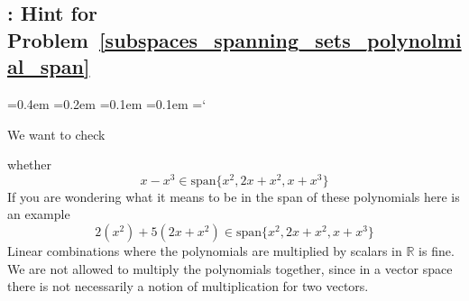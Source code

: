 
\subsection{\subspacesTitle: Hint for Problem~\ref{subspaces_spanning_sets_polynolmial_span}}

{\ttfamily
{}\font=0.4em
\font=0.2em
\font=0.1em
\font=0.1em
\hyphenchar\font=`\-

\hypertarget{subspaces_and_spanning_sets_hint_2}{We want to check} whether 
\[
x-x^3 \in \text{span}\{x^2, 2x+x^2, x+ x^3 \}
\]
If you are wondering what it means to be in the span of these polynomials here is an example
\[
2(x^2) + 5(2x+x^2) \in \text{span}\{x^2, 2x+x^2, x+ x^3 \}
\]
Linear combinations where the polynomials are multiplied by scalars in $\mathbb{R}$ is fine. We are not allowed to multiply the polynomials together, since in a vector space there is not necessarily a notion of multiplication for two vectors.

}
